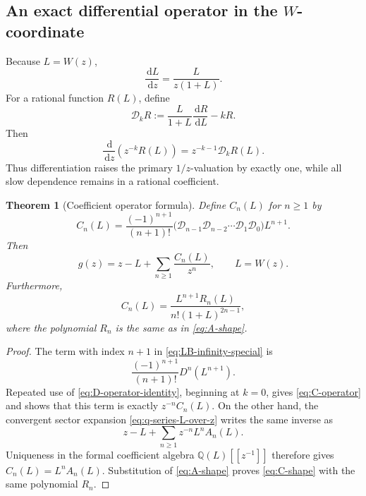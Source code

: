\documentclass[11pt,a4paper]{article}
\numberwithin{equation}{section}
\newtheorem{theorem}{Theorem}[section]
\theoremstyle{definition}
\theoremstyle{remark}
\newcommand{\dd}{\,\mathrm d}
\newcommand{\Acoef}{A}
\newcommand{\Ccoef}{C}
\begin{document}
\subsection[An exact differential operator in the W-coordinate]{An exact differential operator in the \(W\)-coordinate}

Because \(L=W(z)\),
\begin{equation}\label{eq:L-prime}
  \frac{\dd L}{\dd z}=\frac{L}{z(1+L)}.
\end{equation}
For a rational function \(R(L)\), define
\begin{equation}\label{eq:Tk-def}
  \mathcal D_k R
  :=\frac{L}{1+L}\frac{\dd R}{\dd L}-kR.
\end{equation}
Then
\begin{equation}\label{eq:D-operator-identity}
  \frac{\dd}{\dd z}\left(z^{-k}R(L)\right)
  =z^{-k-1}\mathcal D_kR(L).
\end{equation}
Thus differentiation raises the primary \(1/z\)-valuation by exactly one,
while all slow dependence remains in a rational coefficient.

\begin{theorem}[Coefficient operator formula]\label{thm:C-operator}
Define \(\Ccoef_n(L)\) for \(n\ge1\) by
\begin{equation}\label{eq:C-operator}
 \Ccoef_n(L)=\frac{(-1)^{n+1}}{(n+1)!}
 \bigl(\mathcal D_{n-1}\mathcal D_{n-2}\cdots
       \mathcal D_1\mathcal D_0\bigr)L^{n+1}.
\end{equation}
Then
\begin{equation}\label{eq:z-series-C}
  g(z)=z-L+\sum_{n\ge1}\frac{\Ccoef_n(L)}{z^n},
  \qquad L=W(z).
\end{equation}
Furthermore,
\begin{equation}\label{eq:C-shape}
  \Ccoef_n(L)=
  \frac{L^{n+1}R_n(L)}{n!(1+L)^{2n-1}},
\end{equation}
where the polynomial \(R_n\) is the same as in
\eqref{eq:A-shape}.
\end{theorem}

\begin{proof}
The term with index \(n+1\) in \eqref{eq:LB-infinity-special} is
\[
  \frac{(-1)^{n+1}}{(n+1)!}D^n(L^{n+1}).
\]
Repeated use of \eqref{eq:D-operator-identity}, beginning at \(k=0\),
gives \eqref{eq:C-operator} and shows that this term is exactly
\(z^{-n}\Ccoef_n(L)\).  On the other hand, the convergent sector
expansion \eqref{eq:q-series-L-over-z} writes the same inverse as
\[
 z-L+\sum_{n\ge1}z^{-n}L^n\Acoef_n(L).
\]
Uniqueness in the formal coefficient algebra \(\mathbb Q(L)[[z^{-1}]]\)
therefore gives
\(\Ccoef_n(L)=L^n\Acoef_n(L)\).  Substitution of
\eqref{eq:A-shape} proves \eqref{eq:C-shape} with the same polynomial
\(R_n\).
\end{proof}
\end{document}
